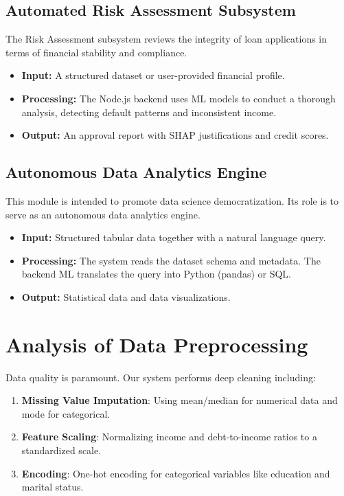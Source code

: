 \documentclass[conference]{IEEEtran}
\begin{document}
\subsection{Automated Risk Assessment Subsystem}
The Risk Assessment subsystem reviews the integrity of loan applications in terms of financial stability and compliance.
\begin{itemize}
    \item \textbf{Input:} A structured dataset or user-provided financial profile.
    \item \textbf{Processing:} The Node.js backend uses ML models to conduct a thorough analysis, detecting default patterns and inconsistent income.
    \item \textbf{Output:} An approval report with SHAP justifications and credit scores. 
\end{itemize}

\subsection{Autonomous Data Analytics Engine}
This module is intended to promote data science democratization. Its role is to serve as an autonomous data analytics engine.
\begin{itemize}
    \item \textbf{Input:} Structured tabular data together with a natural language query.
    \item \textbf{Processing:} The system reads the dataset schema and metadata. The backend ML translates the query into Python (pandas) or SQL.
    \item \textbf{Output:} Statistical data and data visualizations.
\end{itemize}

\section{Analysis of Data Preprocessing}
Data quality is paramount. Our system performs deep cleaning including:
\begin{enumerate}
    \item \textbf{Missing Value Imputation}: Using mean/median for numerical data and mode for categorical.
    \item \textbf{Feature Scaling}: Normalizing income and debt-to-income ratios to a standardized scale.
    \item \textbf{Encoding}: One-hot encoding for categorical variables like education and marital status.
\end{enumerate}
\end{document}
